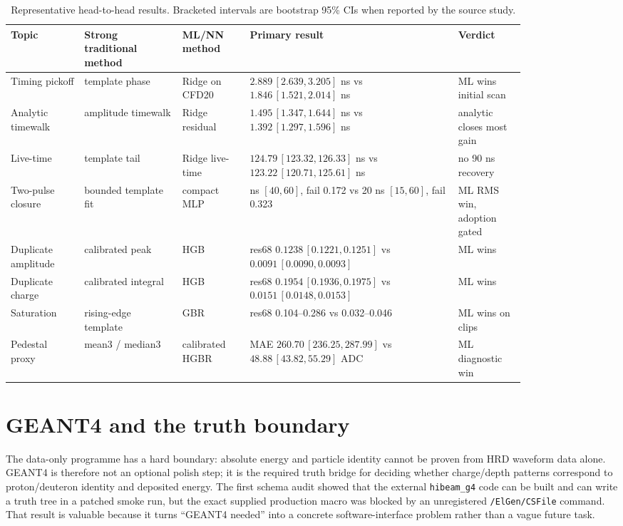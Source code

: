 \begin{table}[H]
  \centering
  \footnotesize
  \setlength{\tabcolsep}{3pt}
  \begin{tabular}{@{}>{\raggedright\arraybackslash}p{0.12\linewidth}>{\raggedright\arraybackslash}p{0.16\linewidth}>{\raggedright\arraybackslash}p{0.11\linewidth}>{\raggedright\arraybackslash}p{0.34\linewidth}>{\raggedright\arraybackslash}p{0.11\linewidth}@{}}
    \toprule
    Topic & Strong traditional method & ML/NN method & Primary result & Verdict \\
    \midrule
    Timing pickoff & template phase & Ridge on CFD20 & \(2.889\,[2.639,3.205]\) ns vs \(1.846\,[1.521,2.014]\) ns & ML wins initial scan \\
    Analytic timewalk & amplitude timewalk & Ridge residual & \(1.495\,[1.347,1.644]\) ns vs \(1.392\,[1.297,1.596]\) ns & analytic closes most gain \\
    Live-time & template tail & Ridge live-time & \(124.79\,[123.32,126.33]\) ns vs \(123.22\,[120.71,125.61]\) ns & no 90 ns recovery \\
    Two-pulse closure & bounded template fit & compact MLP & 60 ns \([40,60]\), fail 0.172 vs 20 ns \([15,60]\), fail 0.323 & ML RMS win, adoption gated \\
    Duplicate amplitude & calibrated peak & HGB & res68 \(0.1238\,[0.1221,0.1251]\) vs \(0.0091\,[0.0090,0.0093]\) & ML wins \\
    Duplicate charge & calibrated integral & HGB & res68 \(0.1954\,[0.1936,0.1975]\) vs \(0.0151\,[0.0148,0.0153]\) & ML wins \\
    Saturation & rising-edge template & GBR & res68 0.104--0.286 vs 0.032--0.046 & ML wins on clips \\
    Pedestal proxy & mean3 / median3 & calibrated HGBR & MAE \(260.70\,[236.25,287.99]\) vs \(48.88\,[43.82,55.29]\) ADC & ML diagnostic win \\
    \bottomrule
  \end{tabular}
  \caption{Representative head-to-head results.  Bracketed intervals are bootstrap 95\% CIs when reported by the source study.}
\end{table}

\section{GEANT4 and the truth boundary}

The data-only programme has a hard boundary: absolute energy and particle identity
cannot be proven from HRD waveform data alone.  GEANT4 is therefore not an optional
polish step; it is the required truth bridge for deciding whether charge/depth
patterns correspond to proton/deuteron identity and deposited energy.  The first
schema audit showed that the external \texttt{hibeam\_g4} code can be built and can
write a truth tree in a patched smoke run, but the exact supplied production macro was
blocked by an unregistered \texttt{/ElGen/CSFile} command.  That result is valuable
because it turns ``GEANT4 needed'' into a concrete software-interface problem rather
than a vague future task.

